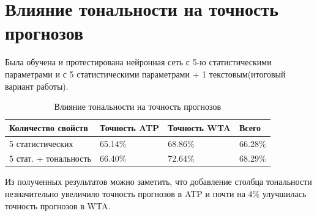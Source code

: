 \section{Влияние тональности на точность прогнозов}
Была обучена и протестирована нейронная сеть с 5-ю статистическими параметрами и с 5 статистическими параметрами + 1 текстовым(итоговый вариант работы).
\begin{table}[!h]	
		\caption{\label{tab:tabletone}Влияние тональности на точность прогнозов}
	\begin{center}
		
		\begin{tabular}{|l|l|l|l|}
			
			\hline
			
			Количество свойств& Точность ATP & Точность WTA & Всего  \\
			
			\hline 
			
			5 статистических & 65.14\% & 68.86\%&  66.28\% \\ \hline
			5 стат. + тональность   & 66.40\%&72.64\% & 68.29\%   \\
			
			
			\hline
		\end{tabular}
		
	\end{center}
	
\end{table}
Из полученных результатов можно заметить, что добавление столбца тональности незначительно увеличило точность прогнозов в ATP и почти на 4\% улучшилась точность прогнозов в WTA.
